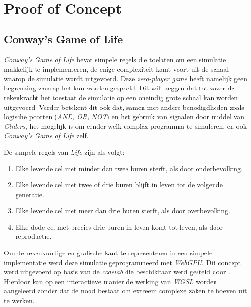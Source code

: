 \iffalse
TODO Dit moet verder in detail worden beschreven
\fi

\chapter{Proof of Concept}
\label{ch:poc}

\section{Conway's Game of Life}
\label{sec:gool}

\textit{Conway's Game of Life} bevat simpele regels die toelaten om een simulatie makkelijk te implementeren, de enige complexiteit komt voort uit de schaal waarop de simulatie wordt uitgevoerd. Deze \textit{zero-player game} heeft namelijk geen begrenzing waarop het kan worden gespeeld. Dit wilt zeggen dat tot zover de rekenkracht het toestaat de simulatie op een oneindig grote schaal kan worden uitgevoerd. Verder betekent dit ook dat, samen met andere benodigdheden zoals logische poorten (\textit{AND, OR, NOT}) en het gebruik van signalen door middel van \textit{Gliders}, het mogelijk is om eender welk complex programma te simuleren, en ook \textit{Conway's Game of Life} zelf.

\bigbreak{}

De simpele regels van \textit{Life} zijn als volgt:
\begin{enumerate}
    \item Elke levende cel met minder dan twee buren sterft, als door onderbevolking.
    \item Elke levende cel met twee of drie buren blijft in leven tot de volgende generatie.
    \item Elke levende cel met meer dan drie buren sterft, als door overbevolking.
    \item Elke dode cel met precies drie buren in leven komt tot leven, als door reproductie.
\end{enumerate}


\break{}

Om de rekenkundige en grafische kant te representeren in een simpele implementatie werd deze simulatie geprogrammeerd met \textit{WebGPU}. Dit concept werd uitgevoerd op basis van de \textit{codelab} die beschikbaar werd gesteld door \textcite{google2023}. Hierdoor kan op een interactieve manier de werking van \textit{WGSL} worden aangeleerd zonder dat de nood bestaat om extreem complexe zaken te hoeven uit te werken.

